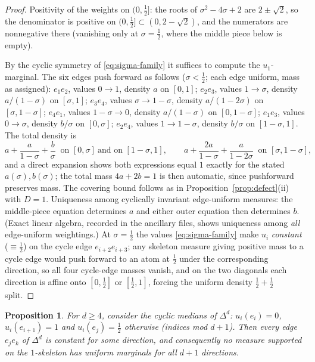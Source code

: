 \documentclass[11pt,reqno]{amsart}
\theoremstyle{plain}
\newtheorem{proposition}[theorem]{Proposition}
\theoremstyle{definition}
\theoremstyle{remark}
\begin{document}
\begin{proof}
Positivity of the weights on $(0,\tfrac12]$: the roots of $\sigma^2-4\sigma+2$
are $2\pm\sqrt2$, so the denominator is positive on
$(0,\tfrac12]\subset(0,2-\sqrt2)$, and the numerators are nonnegative there
(vanishing only at $\sigma=\tfrac12$, where the middle piece below is empty).

By the cyclic symmetry of \eqref{eq:sigma-family} it suffices to compute the
$u_1$-marginal. The six edges push forward as follows ($\sigma<\tfrac12$; each
edge uniform, mass as assigned): $e_1e_2$, values $0\to1$, density $a$ on
$[0,1]$; $e_2e_3$, values $1\to\sigma$, density $a/(1-\sigma)$ on $[\sigma,1]$;
$e_3e_4$, values $\sigma\to1-\sigma$, density $a/(1-2\sigma)$ on
$[\sigma,1-\sigma]$; $e_4e_1$, values $1-\sigma\to0$, density $a/(1-\sigma)$ on
$[0,1-\sigma]$; $e_1e_3$, values $0\to\sigma$, density $b/\sigma$ on
$[0,\sigma]$; $e_2e_4$, values $1\to1-\sigma$, density $b/\sigma$ on
$[1-\sigma,1]$. The total density is
\[
a+\frac{a}{1-\sigma}+\frac b\sigma\ \text{ on }[0,\sigma]\ \text{and on }
[1-\sigma,1],\qquad
a+\frac{2a}{1-\sigma}+\frac{a}{1-2\sigma}\ \text{ on }[\sigma,1-\sigma],
\]
and a direct expansion shows both expressions equal $1$ exactly for the stated
$a(\sigma),b(\sigma)$; the total mass $4a+2b=1$ is then automatic, since
pushforward preserves mass. The covering bound follows as in
Proposition~\ref{prop:defect}(ii) with $D=1$. Uniqueness among cyclically
invariant edge-uniform measures: the middle-piece equation determines $a$ and
either outer equation then determines $b$. (Exact linear algebra, recorded in
the ancillary files, shows uniqueness among \emph{all} edge-uniform weightings.)
At $\sigma=\tfrac12$ the values \eqref{eq:sigma-family}
make $u_i$ \emph{constant} ($\equiv\tfrac12$) on the cycle edge
$e_{i+2}e_{i+3}$; any skeleton measure giving positive mass to a cycle edge
would push forward to an atom at $\tfrac12$ under the corresponding direction,
so all four cycle-edge masses vanish, and on the two diagonals each direction is
affine onto $[0,\tfrac12]$ or $[\tfrac12,1]$, forcing the uniform density
$\tfrac12+\tfrac12$ split.
\end{proof}

\begin{proposition}\label{prop:skelobstruction}
For $d\ge4$, consider the cyclic medians of $\Delta^d$: $u_i(e_i)=0$,
$u_i(e_{i+1})=1$ and $u_i(e_j)=\tfrac12$ otherwise (indices mod $d+1$). Then
\emph{every} edge $e_je_k$ of $\Delta^d$ is constant for some direction, and
consequently no measure supported on the $1$-skeleton has uniform marginals for
all $d+1$ directions.
\end{proposition}
\end{document}
